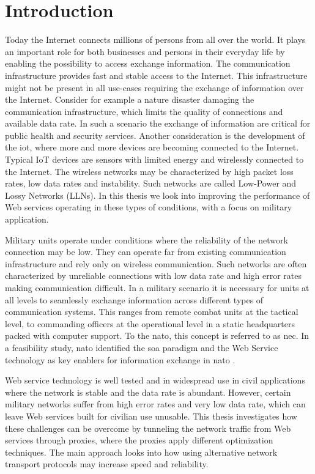 
\chapter{Introduction}

Today the Internet connects millions of persons from all over the world. It
plays an important role for both businesses and persons in their everyday life
by enabling the possibility to access exchange information. The communication
infrastructure provides fast and stable access to the Internet. This
infrastructure might not be present in all use-cases requiring the exchange of
information over the Internet. Consider for example a nature disaster damaging
the communication infrastructure, which limits the quality of connections and
available data rate. In such a scenario the exchange of information are critical
for public health and security services. Another consideration is the
development of the \gls{iot}, where more and more devices are becoming connected
to the Internet. Typical IoT devices are sensors with limited energy and
wirelessly connected to the Internet. The wireless networks may be characterized
by high packet loss rates, low data rates and instability. Such networks are
called Low-Power and Lossy Networks (LLNs). In this thesis we look into
improving the performance of Web services operating in these types of
conditions, with a focus on military application.


Military units operate under conditions where the reliability of the network
connection may be low. They can operate far from existing communication
infrastructure and rely only on wireless communication. Such networks are often
characterized by unreliable connections with low data rate and high error rates
making communication difficult. In a military scenario it is necessary for units
at all levels to seamlessly exchange information across different types of
communication systems. This ranges from remote combat units at the tactical
level, to commanding officers at the operational level in a static headquarters
packed with computer support. To the \gls{nato}, this concept is referred to as
\gls{nec}. In a feasibility study, \gls{nato} identified the \gls{soa} paradigm
and the Web Service technology as key enablers for information exchange in
\gls{nato} \cite{nnec-study}.

Web service technology is well tested and in widespread use in civil
applications where the network is stable and the data rate is abundant. However,
certain military networks suffer from high error rates and very low data rate,
which can leave Web services built for civilian use unusable. This thesis
investigates how these challenges can be overcome by tunneling the network
traffic from Web services through proxies, where the proxies apply different
optimization techniques. The main approach looks into how using alternative
network transport protocols may increase speed and reliability.

